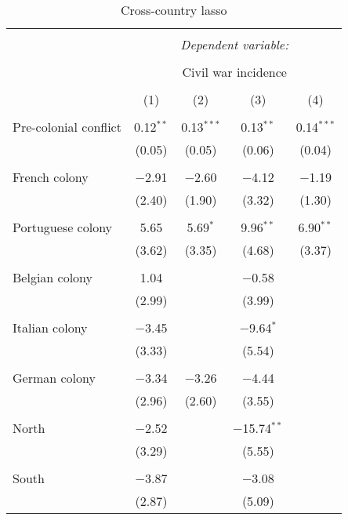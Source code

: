 
\begin{table}[!htbp] \centering 
  \caption{Cross-country lasso} 
  \label{} 
\footnotesize 
\begin{tabular}{@{\extracolsep{2pt}}lcccc} 
\\[-1.8ex]\hline 
\hline \\[-1.8ex] 
 & \multicolumn{4}{c}{\textit{Dependent variable:}} \\ 
\cline{2-5} 
\\[-1.8ex] & \multicolumn{4}{c}{Civil war incidence} \\ 
\\[-1.8ex] & (1) & (2) & (3) & (4)\\ 
\hline \\[-1.8ex] 
 Pre-colonial conflict & 0.12$^{**}$ & 0.13$^{***}$ & 0.13$^{**}$ & 0.14$^{***}$ \\ 
  & (0.05) & (0.05) & (0.06) & (0.04) \\ 
  & & & & \\ 
 French colony & $-$2.91 & $-$2.60 & $-$4.12 & $-$1.19 \\ 
  & (2.40) & (1.90) & (3.32) & (1.30) \\ 
  & & & & \\ 
 Portuguese colony & 5.65 & 5.69$^{*}$ & 9.96$^{**}$ & 6.90$^{**}$ \\ 
  & (3.62) & (3.35) & (4.68) & (3.37) \\ 
  & & & & \\ 
 Belgian colony & 1.04 &  & $-$0.58 &  \\ 
  & (2.99) &  & (3.99) &  \\ 
  & & & & \\ 
 Italian colony & $-$3.45 &  & $-$9.64$^{*}$ &  \\ 
  & (3.33) &  & (5.54) &  \\ 
  & & & & \\ 
 German colony & $-$3.34 & $-$3.26 & $-$4.44 &  \\ 
  & (2.96) & (2.60) & (3.55) &  \\ 
  & & & & \\ 
 North & $-$2.52 &  & $-$15.74$^{**}$ &  \\ 
  & (3.29) &  & (5.55) &  \\ 
  & & & & \\ 
 South & $-$3.87 &  & $-$3.08 &  \\ 
  & (2.87) &  & (5.09) &  \\ 

\end{tabular}
\end{table}
